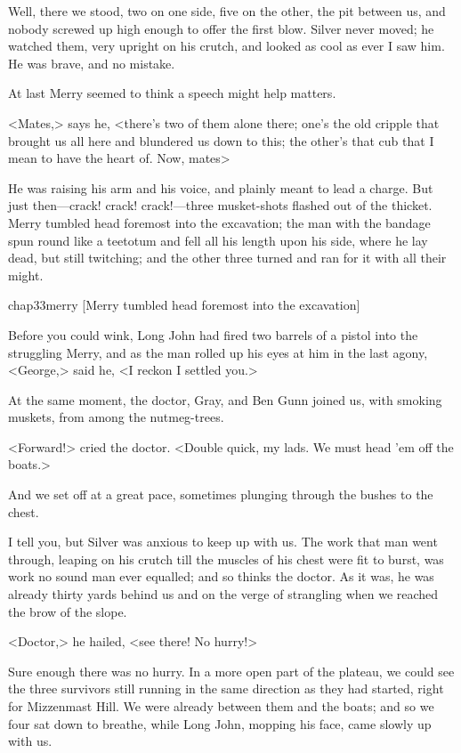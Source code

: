 Well, there we stood, two on one side, five on the other, the pit between us, and nobody screwed up high enough to offer the first blow. Silver never moved; he watched them, very upright on his crutch, and looked as cool as ever I saw him. He was brave, and no mistake.

At last Merry seemed to think a speech might help matters.

<Mates,> says he, <there's two of them alone there; one's the old cripple that brought us all here and blundered us down to this; the other's that cub that I mean to have the heart of. Now, mates\longdash>

He was raising his arm and his voice, and plainly meant to lead a charge. But just then—crack! crack! crack!—three musket-shots flashed out of the thicket. Merry tumbled head foremost into the excavation; the man with the bandage spun round like a teetotum and fell all his length upon his side, where he lay dead, but still twitching; and the other three turned and ran for it with all their might.

\begin{bwbigpic}
	[\basicscale]
	{chap33merry}
	[Merry tumbled head foremost into the excavation]
\end{bwbigpic}

Before you could wink, Long John had fired two barrels of a pistol into the struggling Merry, and as the man rolled up his eyes at him in the last agony, <George,> said he, <I reckon I settled you.>

At the same moment, the doctor, Gray, and Ben Gunn joined us, with smoking muskets, from among the nutmeg-trees.

<Forward!> cried the doctor. <Double quick, my lads. We must head 'em off the boats.>

And we set off at a great pace, sometimes plunging through the bushes to the chest.

I tell you, but Silver was anxious to keep up with us. The work that man went through, leaping on his crutch till the muscles of his chest were fit to burst, was work no sound man ever equalled; and so thinks the doctor. As it was, he was already thirty yards behind us and on the verge of strangling when we reached the brow of the slope.

<Doctor,> he hailed, <see there! No hurry!>

Sure enough there was no hurry. In a more open part of the plateau, we could see the three survivors still running in the same direction as they had started, right for Mizzenmast Hill. We were already between them and the boats; and so we four sat down to breathe, while Long John, mopping his face, came slowly up with us.

